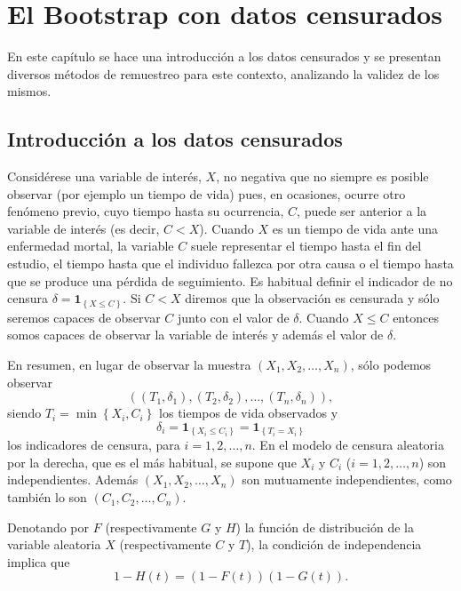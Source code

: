 \documentclass[
]{book}
\renewcommand{\mathbf}[1]{\symbf{#1}}
\theoremstyle{break}
\theoremstyle{nonumberplain}
\begin{document}
\chapter{El Bootstrap con datos censurados}\label{bootcen}

En este capítulo se hace una introducción a los datos censurados y se
presentan diversos métodos de remuestreo para este contexto, analizando
la validez de los mismos.

\section{Introducción a los datos censurados}\label{introducciuxf3n-a-los-datos-censurados}

Considérese una variable de interés, \(X\), no negativa que no siempre es
posible observar (por ejemplo un tiempo de vida) pues, en ocasiones,
ocurre otro fenómeno previo, cuyo tiempo hasta su ocurrencia, \(C\), puede
ser anterior a la variable de interés (es decir, \(C<X\)). Cuando \(X\) es
un tiempo de vida ante una enfermedad mortal, la variable \(C\) suele
representar el tiempo hasta el fin del estudio, el tiempo hasta que el
individuo fallezca por otra causa o el tiempo hasta que se produce una
pérdida de seguimiento. Es habitual definir el indicador de no censura
\(\delta
=\mathbf{1}_{\left\{ X\leq C\right\} }\). Si \(C<X\) diremos que la
observación es censurada y sólo seremos capaces de observar \(C\) junto
con el valor de \(\delta\). Cuando \(X\leq C\) entonces somos capaces de
observar la variable de interés y además el valor de \(\delta\).

En resumen, en lugar de observar la muestra
\(\left( X_1, X_2, \ldots, X_n \right)\), sólo podemos observar
\[\left( \left( T_1, \delta _1 \right), \left( T_2, \delta _2 \right),
\ldots ,\left( T_n, \delta_n \right) \right),\]
siendo \(T_i=\min \left\{ X_i,C_i\right\}\)
los tiempos de vida observados y
\[\delta _i=\mathbf{1}_{\left\{ X_i\leq
C_i\right\} }=\mathbf{1}_{\left\{ T_i=X_i\right\} }\]
los indicadores de censura, para \(i=1,2,\ldots ,n\).
En el modelo de censura aleatoria por la derecha,
que es el más habitual, se supone que \(X_i\)
y \(C_i\) (\(i=1,2,\ldots ,n\)) son independientes.
Además \(\left( X_1, X_2, \ldots ,X_n \right)\) son mutuamente independientes,
como también lo son \(\left( C_1, C_2,\ldots ,C_n \right)\).

Denotando por \(F\) (respectivamente \(G\) y \(H\)) la función de distribución
de la variable aleatoria \(X\) (respectivamente \(C\) y \(T\)), la condición
de independencia implica que
\[1-H\left( t \right) =\left( 1-F\left(
t \right) \right) \left( 1-G\left( t \right) \right).\]
\end{document}
